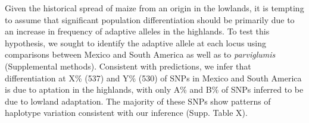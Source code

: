 {{Given the historical spread of maize from an origin in the lowlands, it is tempting to assume that significant population differentiation should be primarily due to an increase in frequency of adaptive alleles in the highlands.
To test this hypothesis, we sought to identify the adaptive allele at each locus using comparisons between Mexico and South America as well as to \emph{parviglumis} (Supplemental methods).
%
%
%
%
Consistent with predictions, we infer that differentiation at X\% (537) and Y\% (530) of SNPs in Mexico and South America is due to aptation in the highlands, with only A\% and B\% of SNPs inferred to be due to lowland adaptation. The majority of these SNPs show patterns of haplotype variation consistent with our inference (Supp. Table X).
%

}}
